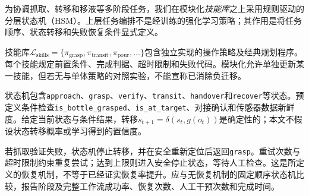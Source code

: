 为协调抓取、转移和移液等多阶段任务，我们在模块化\textit{技能库}之上采用规则驱动的分层状态机（HSM）。上层任务编排不是经训练的强化学习策略；其作用是将任务顺序、状态转移和失败恢复条件显式定义。

技能库$\mathcal{L}_{\text{skills}} = \{\pi_{\text{grasp}}, \pi_{\text{transit}}, \pi_{\text{pour}}, \dots\}$包含独立实现的操作策略及经典规划程序。每个技能规定前置条件、完成判据、超时限制和失败代码。模块化允许单独更新某一技能，但若无与单体策略的对照实验，不能宣称已消除负迁移。

状态机包含\texttt{approach}、\texttt{grasp}、\texttt{verify}、\texttt{transit}、\texttt{handover}和\texttt{recover}等状态。预定义条件检查\texttt{is\_bottle\_grasped}、\texttt{is\_at\_target}、对接确认和传感器数据新鲜度。给定当前状态与条件结果，转移$s_{t+1}=\delta(s_t,g(o_t))$是确定性的；本文不假设状态转移概率或学习得到的置信度。


若抓取验证失败，状态机停止转移，并在安全重新定位后返回\texttt{grasp}。重试次数与超时限制约束重复尝试；达到上限则进入安全停止状态，等待人工检查。这是所定义的恢复机制，不等于已经证实恢复率提升。应与无恢复机制的固定顺序状态机比较，报告阶段及完整工作流成功率、恢复次数、人工干预次数和完成时间。

